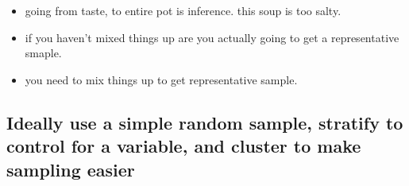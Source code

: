 \documentclass[11pt,containsverbatim,handout,xcolor=xelatex,dvipsnames,table]{beamer}
\begin{document}
\begin{frame}
{\begin{itemize}
\item going from taste, to entire pot is inference.  this soup is too salty.

\item if you haven't mixed things up are you actually going to get a representative
smaple.

\item you need to mix things up to get representative sample.
\end{itemize}

}

\end{frame}


\subsection{Ideally use a simple random sample, stratify to control for a variable, and cluster to make sampling easier} 
\label{mi2}

\end{document}
